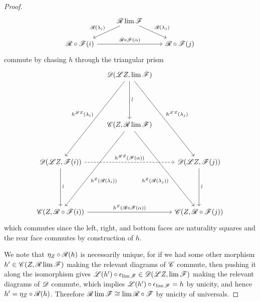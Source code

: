 \documentclass[10pt]{amsart}
\begin{document}
\begin{prop}
\begin{proof}
$$\begin{tikzcd}
    &\RA \lim \F\arrow[swap]{ld}{\RA(\lambda_i)}\arrow{rd}{\RA(\lambda_j)}\\
    \RA \circ \F(i) \arrow{rr}{\RA \circ \F(\alpha)} & & \RA \circ \F(j)
  \end{tikzcd}$$
  commute by chasing $h$ through the triangular prism
  $$\begin{tikzcd}
    & \D(\LA Z, \lim \F) \arrow[swap]{lddddd}{h^{\LA Z}(\lambda_i)}\arrow{rddddd}{h^{\LA Z}(\lambda_j)}\arrow{ddd}[rotate=90,yshift=-1ex,xshift=-1ex]{\sim}\\
    \\
    \\
    & \C(Z, \RA \lim \F)\arrow[crossing over]{lddddd}[pos=0.6]{h^Z(\RA(\lambda_i))}\arrow[crossing over,swap]{rddddd}[pos=0.6]{h^Z(\RA(\lambda_j))}\\
    \\
    \D(\LA Z, \F(i)) \arrow[dashed]{rr}{h^{\LA Z}(\F(\alpha))}\arrow{ddd}[rotate=90,yshift=-1ex,xshift=-1ex]{\sim}& & \D(\LA Z, \F(j))\arrow{ddd}[rotate=90,yshift=-1ex,xshift=-1ex]{\sim}\\
    \\
    \\
    \C(Z, \RA \circ \F(i))\arrow{rr}{h^Z(\RA \circ \F(\alpha))} & & \C(Z, \RA \circ \F(j))
  \end{tikzcd}$$
  which commutes since the left, right, and bottom faces are naturality squares and the rear face commutes by construction of $h$.
  
  We note that $\eta_Z \circ \mathscr{R}(h)$ is necessarily unique, for if we had some other morphism $h^\prime \in \mathscr{C}(Z, \mathscr{R} \lim \mathscr{F})$ making the relevant diagrams of $\mathscr{C}$ commute, then pushing it along the isomorphism gives $\mathscr{L}(h^\prime) \circ \epsilon_{\lim \mathscr{F}} \in \mathscr{D}(\mathscr{L} Z, \lim \mathscr{F})$ making the relevant diagrams of $\mathscr{D}$ commute, which implies $\mathscr{L}(h^\prime) \circ \epsilon_{\lim \mathscr{F}} = h$ by unicity, and hence $h^\prime = \eta_Z \circ \mathscr{R}(h)$.
  Therefore $\mathscr{R} \lim \mathscr{F} \cong \lim \mathscr{R} \circ \mathscr{F}$ by unicity of universals.
  \end{proof}
\end{prop}
\end{document}
